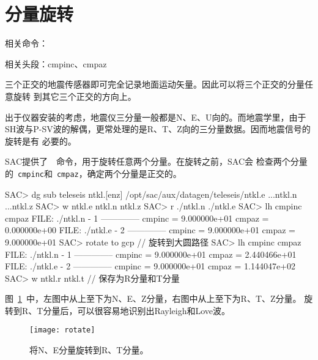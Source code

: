 \section{分量旋转}
\label{sec:traces-rotating}
相关命令：

相关头段：cmpinc、cmpaz

三个正交的地震传感器即可完全记录地面运动矢量。因此可以将三个正交的分量任意旋转
到其它三个正交的方向上。

出于仪器安装的考虑，地震仪三分量一般都是N、E、U向的。而地震学里，由于
SH波与P-SV波的解偶，更常处理的是R、T、Z向的三分量数据。因而地震信号的旋转是有
必要的。

SAC提供了~~命令，用于旋转任意两个分量。在旋转之前，SAC会
检查两个分量的~\verb+cmpinc+和~\verb+cmpaz+，确定两个分量是正交的。

\begin{SACCode}
SAC> dg sub teleseis ntkl.[enz]
/opt/sac/aux/datagen/teleseis/ntkl.e ...ntkl.n ...ntkl.z
SAC> w ntkl.e ntkl.n ntkl.z
SAC> r ./ntkl.n ./ntkl.e
SAC> lh cmpinc cmpaz
  FILE: ./ntkl.n - 1
 --------------
     cmpinc = 9.000000e+01
      cmpaz = 0.000000e+00
  FILE: ./ntkl.e - 2
 --------------
     cmpinc = 9.000000e+01
      cmpaz = 9.000000e+01
SAC> rotate to gcp              // 旋转到大圆路径
SAC> lh cmpinc cmpaz
  FILE: ./ntkl.n - 1
 --------------
     cmpinc = 9.000000e+01
      cmpaz = 2.440466e+01
  FILE: ./ntkl.e - 2
 --------------
     cmpinc = 9.000000e+01
      cmpaz = 1.144047e+02
SAC> w ntkl.r ntkl.t            // 保存为R分量和T分量
\end{SACCode}

图~\ref{fig:rotate}~中，左图中从上至下为N、E、Z分量，右图中从上至下为R、T、Z分量。
旋转到R、T分量后，可以很容易地识别出Rayleigh和Love波。

\begin{figure}[H]
\centering
\texttt{[image: rotate]}
\caption[水平分量旋转]{将N、E分量旋转到R、T分量。}
\label{fig:rotate}
\end{figure}
